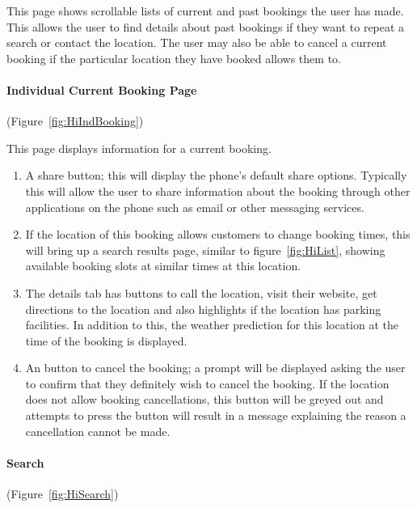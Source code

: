 This page shows scrollable lists of current and past bookings the user has
made. This allows the user to find details about past bookings if they want to
repeat a search or contact the location. The user may also be able to cancel a
current booking if the particular location they have booked allows them to.

\paragraph{Individual Current Booking Page} (Figure~\ref{fig:HiIndBooking})


This page displays information for a current booking.
\begin{enumerate}
	\item A share button; this will display the phone's default share options.
		Typically this will allow the user to share information about the
		booking through other applications on the phone such as email or other
		messaging services.
	\item If the location of this booking allows customers to change booking
		times, this will bring up a search results page, similar to
		figure~\ref{fig:HiList}, showing available booking slots at similar
		times at this location.
	\item The details tab has buttons to call the location, visit their
		website, get directions to the location and also highlights if the
		location has parking facilities. In addition to this, the weather
		prediction for this location at the time of the booking is displayed.
	\item An button to cancel the booking; a prompt will be displayed asking
		the user to confirm that they definitely wish to cancel the booking.
		If the location does not allow booking cancellations, this button will
		be greyed out and attempts to press the button will result in a message
		explaining the reason a cancellation cannot be made.
\end{enumerate}

\paragraph{Search} (Figure~\ref{fig:HiSearch})

